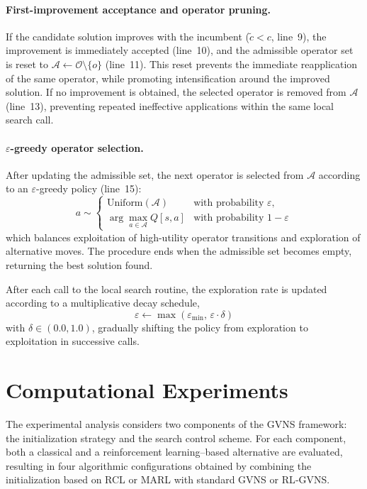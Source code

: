 \documentclass[runningheads]{llncs}
\begin{document}
\paragraph{First-improvement acceptance and operator pruning.}
If the candidate solution improves with the incumbent ($\tilde{c} < c$, line~9), the improvement is immediately accepted (line~10), and the admissible operator set is reset to $\mathcal{A} \gets \mathcal{O} \setminus \{o\}$ (line~11). This reset prevents the immediate reapplication of the same operator, while promoting intensification around the improved solution. If no improvement is obtained, the selected operator is removed from $\mathcal{A}$ (line~13), preventing repeated ineffective applications within the same local search call.

\paragraph{$\varepsilon$-greedy operator selection.}
After updating the admissible set, the next operator is selected from $\mathcal{A}$ according to an $\varepsilon$-greedy policy (line~15):
\begin{equation}
a \sim
\begin{cases}
\text{Uniform}(\mathcal{A}) & \text{with probability } \varepsilon,\\
\arg\max\limits_{a\in\mathcal{A}} Q[s,a] & \text{with probability } 1-\varepsilon
\end{cases}
\end{equation}
which balances exploitation of high-utility operator transitions and exploration of alternative moves. The procedure ends when the admissible set becomes empty, returning the best solution found.

After each call to the local search routine, the exploration rate is updated according to a multiplicative decay schedule,
\begin{equation}
\varepsilon \leftarrow \max(\varepsilon_{\min},\, \varepsilon \cdot \delta)
\end{equation}
with $\delta \in (0.0,1.0)$, gradually shifting the policy from exploration to exploitation in successive calls.


\section{Computational Experiments}
\label{sec:computational_experiments}

The experimental analysis considers two components of the GVNS framework: the initialization strategy and the search control scheme. 
For each component, both a classical and a reinforcement learning–based alternative are evaluated, resulting in four algorithmic configurations obtained by combining the initialization based on RCL or MARL with standard GVNS or RL‑GVNS.
\end{document}
